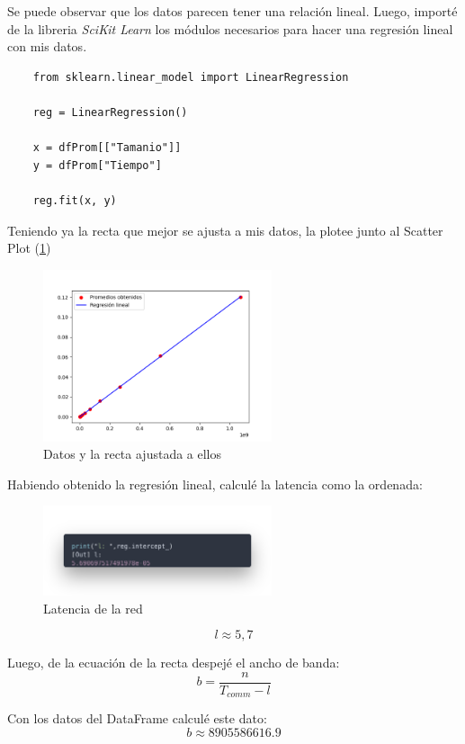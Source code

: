 Se puede observar que los datos parecen tener una relación lineal. Luego, importé de la libreria \textit{SciKit Learn} los módulos necesarios para hacer una regresión lineal con mis datos.

\begin{lstlisting}
    from sklearn.linear_model import LinearRegression

    reg = LinearRegression()

    x = dfProm[["Tamanio"]]
    y = dfProm["Tiempo"]
    
    reg.fit(x, y)
\end{lstlisting}

Teniendo ya la recta que mejor se ajusta a mis datos, la plotee junto al Scatter Plot (\ref{fig:regej1})

\begin{figure}[H]
    \centering
    \includegraphics[width=0.60\textwidth]{Images/ej1/reglinej1.png}
    \caption{Datos y la recta ajustada a ellos}
    \label{fig:regej1}
\end{figure}

Habiendo obtenido la regresión lineal, calculé la latencia como la ordenada:

\begin{figure}[H]
    \centering
    \includegraphics[width=0.60\textwidth]{Images/ej1/intercept.png}
    \caption{Latencia de la red}
    \label{fig:latej1}
\end{figure}

$$l \approx 5,7$$

Luego, de la ecuación de la recta despejé el ancho de banda:
$$b = \frac{n}{T_{comm} - l}$$

Con los datos del DataFrame calculé este dato:
$$b \approx 8905586616.9$$
